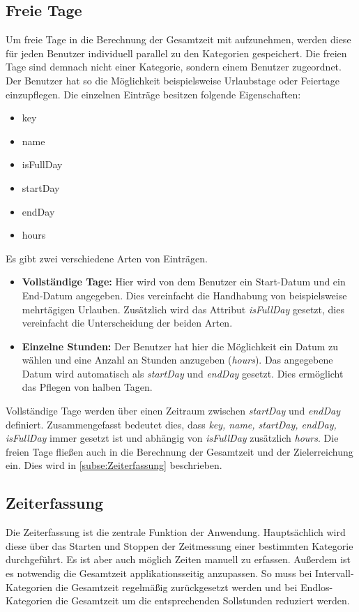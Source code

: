 \subsection{Freie Tage}
Um freie Tage in die Berechnung der Gesamtzeit mit aufzunehmen, werden diese für jeden Benutzer individuell parallel zu
den Kategorien gespeichert. Die freien Tage sind demnach nicht einer Kategorie, sondern einem Benutzer zugeordnet. 
Der Benutzer hat so die Möglichkeit beispielsweise Urlaubstage oder Feiertage einzupflegen.
Die einzelnen Einträge besitzen folgende Eigenschaften: 
\begin{itemize}
    \item key
    \item name
    \item isFullDay
    \item startDay
    \item endDay
    \item hours
\end{itemize}
Es gibt zwei verschiedene Arten von Einträgen.
\begin{itemize}
    \item \textbf{Vollständige Tage:} Hier wird von dem Benutzer ein Start-Datum und ein End-Datum angegeben. 
    Dies vereinfacht die Handhabung von beispielsweise mehrtägigen Urlauben. 
    Zusätzlich wird das Attribut \textit{isFullDay} gesetzt, 
    dies vereinfacht die Unterscheidung der beiden Arten.
    \item \textbf{Einzelne Stunden:} Der Benutzer hat hier die Möglichkeit ein Datum zu wählen und eine Anzahl an Stunden anzugeben (\textit{hours}). 
    Das angegebene Datum wird automatisch als \textit{startDay} und \textit{endDay} gesetzt. 
    Dies ermöglicht das Pflegen von halben Tagen. 
\end{itemize}Vollständige Tage werden über einen Zeitraum zwischen \textit{startDay} und \textit{endDay} definiert. 
Zusammengefasst bedeutet dies, dass \textit{key, name, startDay, endDay, isFullDay} immer gesetzt ist und abhängig von \textit{isFullDay} zusätzlich \textit{hours}.
Die freien Tage fließen auch in die Berechnung der Gesamtzeit und der Zielerreichung ein.
Dies wird in \autoref{subse:Zeiterfassung} beschrieben. 

\subsection{Zeiterfassung}\label{subse:Zeiterfassung}
Die Zeiterfassung ist die zentrale Funktion der Anwendung.
Hauptsächlich wird diese über das Starten und Stoppen der Zeitmessung einer bestimmten Kategorie durchgeführt.
Es ist aber auch möglich Zeiten manuell zu erfassen.
Außerdem ist es notwendig die Gesamtzeit applikationsseitig anzupassen. %
So muss bei Intervall-Kategorien die Gesamtzeit regelmäßig zurückgesetzt werden
und bei Endlos-Kategorien die Gesamtzeit um die entsprechenden Sollstunden reduziert werden.

